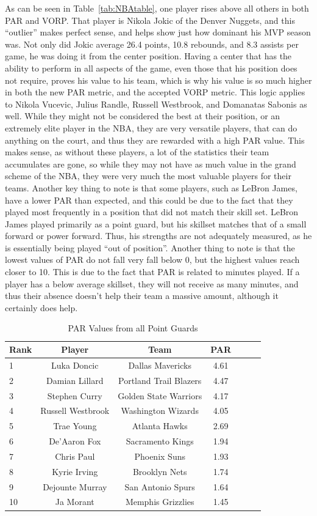 \documentclass[12pt]{article}
\begin{document}
As can be seen in Table~\ref{tab:NBAtable}, one player rises above all 
others in 
both PAR and VORP. 
That player is Nikola Jokic of the 
Denver Nuggets, and this ``outlier'' makes perfect sense, and helps show 
just how dominant his MVP 
season was. Not only did Jokic average 26.4 points, 10.8 rebounds, and 
8.3 assists per game, he was 
doing it from the center position. Having a center that has the ability to 
perform in all aspects of the game, 
even those that his position does not require, proves his value to his 
team, which is why his value is so 
much higher in both the new PAR metric, and the accepted VORP metric. 
This logic applies to Nikola 
Vucevic, Julius Randle, Russell Westbrook, and Domanatas Sabonis as 
well. While they might not be 
considered the best at their position, or an extremely elite player in the 
NBA, they are very versatile players, 
that can do anything on the court, and thus they are rewarded with a high 
PAR value. This makes sense, as 
without these players, a lot of the statistics their team accumulates are 
gone, so while they may not have as 
much value in the grand scheme of the NBA, they were very much the 
most valuable players for their 
teams. Another key thing to note is that some players, such as LeBron 
James, have a lower PAR than 
expected, and this could be due to the fact that they played most 
frequently in a position that did not match 
their skill set. LeBron James played primarily as a point guard, but his 
skillset matches that of a small 
forward or power forward. Thus, his strengths are not adequately 
measured, as he is essentially being 
played ``out of position''. Another thing to note is that the lowest values 
of PAR do not fall very fall below 0, but the highest values reach closer 
to 10. This is due to the fact that PAR is related to minutes played. If a 
player has a below average skillset, they will not receive as many 
minutes, and thus their absence doesn't help their team a massive 
amount, although it certainly does help.

\begin{table}[H]
  \caption{PAR Values from all Point Guards}
  \label{tab:PGtable}
\centering
\begin{tabular}[t]{lcccccc}
  \toprule
  Rank & Player & Team & PAR\\
  \midrule
 1 & Luka Doncic & Dallas Mavericks & 4.61\\
 2 & Damian Lillard & Portland Trail Blazers & 4.47\\
 3 & Stephen Curry & Golden State Warriors & 4.17\\
 4 & Russell Westbrook & Washington Wizards & 4.05\\
 5 & Trae Young & Atlanta Hawks & 2.69\\
 6 & De'Aaron Fox & Sacramento Kings & 1.94\\
 7 & Chris Paul & Phoenix Suns & 1.93\\
 8 & Kyrie Irving & Brooklyn Nets & 1.74\\
 9 & Dejounte Murray & San Antonio Spurs & 1.64\\
 10 & Ja Morant & Memphis Grizzlies & 1.45\\
  \bottomrule
\end{tabular}
\end{table}
\end{document}
